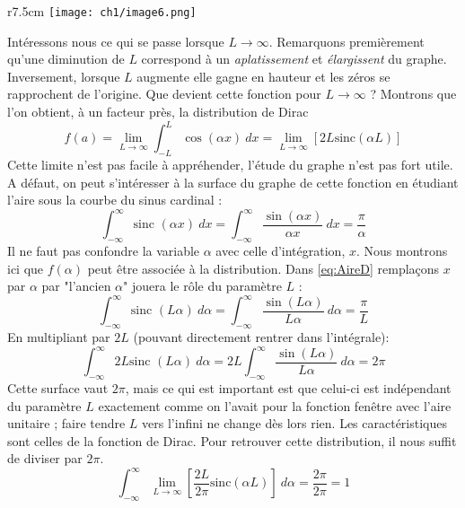 \begin{wrapfigure}[8]{r}{7.5cm}
\vspace{-15mm}
\texttt{[image: ch1/image6.png]}
\end{wrapfigure}
Intéressons nous ce qui se passe lorsque $L \rightarrow \infty$. Remarquons premièrement 
qu'une diminution de $L$ correspond à un \textit{aplatissement} et \textit{élargissent} du 
graphe. Inversement, lorsque $L$ augmente elle gagne en hauteur et les zéros se rapprochent 
de l'origine. Que devient cette fonction pour $L \rightarrow\infty$ ? Montrons que l'on 
obtient, à un facteur près, la distribution de Dirac 
\begin{equation}
f(a) = \lim\limits_{L\rightarrow\infty} \int_{-L}^L \cos(\alpha x)\ dx = \lim\limits_{L 
\rightarrow \infty}[2L\text{sinc}(\alpha L)]
\end{equation}
Cette limite n'est pas facile à appréhender, l'étude du graphe n'est pas fort utile. A 
défaut, on peut s'intéresser à la surface du graphe de cette fonction en étudiant l'aire 
sous la courbe du sinus cardinal :
\begin{equation}
\int_{-\infty}^\infty \text{sinc }(\alpha x)\ dx = \int_{-\infty}^\infty \dfrac{\sin(\alpha
x)}{\alpha x}\ dx = \dfrac{\pi}{\alpha}
\label{eq:AireD}
\end{equation}
\danger Il ne faut pas confondre la variable $\alpha$ avec celle d'intégration, $x$. Nous 
montrons ici que $f(\alpha)$ peut être associée à la distribution. Dans \autoref{eq:AireD} 
remplaçons $x$ par $\alpha$ par "l'ancien $\alpha$" jouera le rôle du paramètre $L$ :
\begin{equation}
\int_{-\infty}^\infty \text{sinc }(L\alpha)\ d\alpha = \int_{-\infty}^\infty \dfrac{\sin(L\alpha)
}{L\alpha}\ d\alpha = \dfrac{\pi}{L}
\end{equation}
En multipliant par $2L$ (pouvant directement rentrer dans l'intégrale):
\begin{equation}
\int_{-\infty}^\infty2L \text{sinc }(L\alpha)\ d\alpha = 2L \int_{-\infty}^\infty \dfrac{\sin(L\alpha)
}{L \alpha}\ d\alpha = 2\pi
\end{equation}
Cette surface vaut $2\pi$, mais ce qui est important est que celui-ci est indépendant 
du paramètre $L$ exactement comme on l'avait pour la fonction fenêtre avec l'aire unitaire ; 
faire tendre $L$ vers l'infini ne change dès lors rien. Les caractéristiques sont celles de 
la fonction de Dirac. Pour retrouver cette distribution, il nous suffit de diviser par $2\pi$.
\begin{equation}
\int_{-\infty}^\infty \lim\limits_{L\rightarrow\infty}[\frac{2L}{2\pi}\text{sinc}(\alpha L)]\ 
d\alpha = \frac{2\pi}{2\pi}=1
\end{equation}
